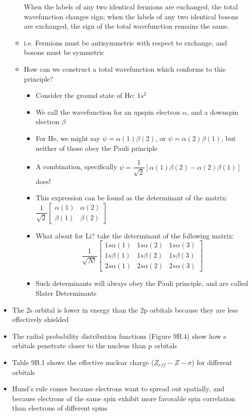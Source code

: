 \documentclass[12pt, openany, letterpaper]{memoir}
\begin{document}
\begin{itemize}
\begin{itemize}
		When the labels of any two identical fermions are exchanged, the total wavefunction changes sign; when the labels of any two identical bosons are exchanged, the sign of the total wavefunction remains the same.
		\item i.e. Fermions must be antisymmetric with respect to exchange, and bosons must be symmetric
		\item How can we construct a total wavefunction which conforms to this principle?
		\begin{itemize}
			\item Consider the ground state of He: $1s^2$
			\item We call the wavefunction for an upspin electron $\alpha$, and a downspin electron $\beta$
			\item For He, we might say $\psi=\alpha(1)\beta(2)$, or $\psi=\alpha(2)\beta(1)$, but neither of those obey the Pauli principle
			\item A combination, specifically $\psi=\dfrac{1}{\sqrt{2}}\left[\alpha(1)\beta(2)-\alpha(2)\beta(1)\right]$ does!
			\item This expression can be found as the determinant of the matrix: $\dfrac{1}{\sqrt{2}}\begin{bmatrix} \alpha(1) & \alpha(2) \\ \beta(1) & \beta (2) \end{bmatrix}$
			\item What about for Li? take the determinant of the following matrix: 
			\[ \dfrac{1}{\sqrt{N!}}\begin{bmatrix} 
			1s\alpha(1) & 1s\alpha(2) & 1s\alpha(3)\\
			1s\beta(1) & 1s\beta(2) & 1s\beta(3)\\
			2s\alpha(1) & 2s\alpha(2) & 2s\alpha(3)
			\end{bmatrix} \]
			\item Such determinants will always obey the Pauli principle, and are called Slater Determinants
		\end{itemize}	
	\end{itemize}
	\item The 2s orbital is lower in energy than the 2p orbitals because they are less effectively shielded
	\item The radial probability distribution functions (Figure 9B.4) show how s orbitals penetrate closer to the nucleus than p orbitals
	\item Table 9B.1 shows the effective nuclear charge ($Z_{eff}-Z-\sigma$) for different orbitals
	\item Hund's rule comes because electrons want to spread out spatially, and because electrons of the same spin exhibit more favorable spin correlation than electrons of different spins

\end{itemize}
\end{document}
